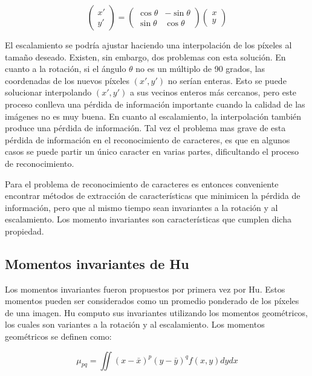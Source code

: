 \documentclass[a4paper, 11pt, oneside]{report}
\begin{document}
	\[
		\begin{pmatrix} 
			x' \\ y'
		\end{pmatrix}
		=
		\begin{pmatrix} 
			\cos\theta & -\sin\theta \\
			\sin\theta & \cos\theta
		\end{pmatrix}
		\begin{pmatrix} 
			x \\ y
		\end{pmatrix}
	\]

El escalamiento se podría ajustar haciendo una interpolación de los píxeles al tamaño deseado. Existen, sin embargo, dos problemas con esta solución. En cuanto a la rotación, si el ángulo $\theta$ no es un múltiplo de 90 grados, las coordenadas de los nuevos píxeles $(x', y')$ no serían enteras. Esto se puede solucionar interpolando $(x',y')$ a sus vecinos enteros más cercanos, pero este proceso conlleva una pérdida de información importante cuando la calidad de las imágenes no es muy buena. En cuanto al escalamiento, la interpolación también produce una pérdida de información. Tal vez el problema mas grave de esta pérdida de información en el reconocimiento de caracteres, es que en algunos casos se puede partir un único caracter en varias partes, dificultando el proceso de reconocimiento.

Para el problema de reconocimiento de caracteres es entonces conveniente encontrar métodos de extracción de características que minimicen la pérdida de información, pero que al mismo tiempo sean invariantes a la rotación y al escalamiento. Los momento invariantes son características que cumplen dicha propiedad.

\subsection{Momentos invariantes de Hu}	
\label{sect:invariants}

Los momentos invariantes fueron propuestos por primera vez por Hu\cite{Hu62}. Estos momentos pueden ser considerados como un promedio ponderado de los píxeles de una imagen. Hu computo sus invariantes utilizando los momentos geométricos, los cuales son variantes a la rotación y al escalamiento. Los momentos geométricos se definen como:

	\begin{equation}\label{eq1}
		\mu_{pq} = \iint{ {(x-\bar{x})^p} {(y-\bar{y})^q} f(x,y) dy dx }
	\end{equation}
\end{document}
